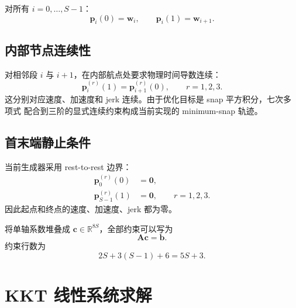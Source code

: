 \documentclass[UTF8,a4paper,11pt]{ctexart}
\newcommand{\R}{\mathbb{R}}
\begin{document}
对所有 $i=0,\ldots,S-1$：
\begin{equation}
  \bm p_i(0)=\bm w_i,\qquad
  \bm p_i(1)=\bm w_{i+1}.
  \label{eq:waypoint-constraints}
\end{equation}

\subsection{内部节点连续性}

对相邻段 $i$ 与 $i+1$，在内部航点处要求物理时间导数连续：
\begin{equation}
  \bm p_i^{(r)}(1)=\bm p_{i+1}^{(r)}(0),
  \qquad r=1,2,3.
  \label{eq:continuity}
\end{equation}
这分别对应速度、加速度和 jerk 连续。由于优化目标是 snap 平方积分，七次多项式
配合到三阶的显式连续约束构成当前实现的 minimum-snap 轨迹。

\subsection{首末端静止条件}

当前生成器采用 rest-to-rest 边界：
\begin{equation}
\begin{aligned}
  \bm p_0^{(r)}(0)&=\bm0,\\
  \bm p_{S-1}^{(r)}(1)&=\bm0,
  \qquad r=1,2,3.
\end{aligned}
\label{eq:boundary-derivatives}
\end{equation}
因此起点和终点的速度、加速度、jerk 都为零。

将单轴系数堆叠成 $\bm c\in\R^{8S}$，全部约束可以写为
\begin{equation}
  \bm A\bm c=\bm b.
  \label{eq:equality-system}
\end{equation}
约束行数为
\begin{equation}
  2S+3(S-1)+6=5S+3.
\end{equation}

\section{KKT 线性系统求解}
\end{document}
